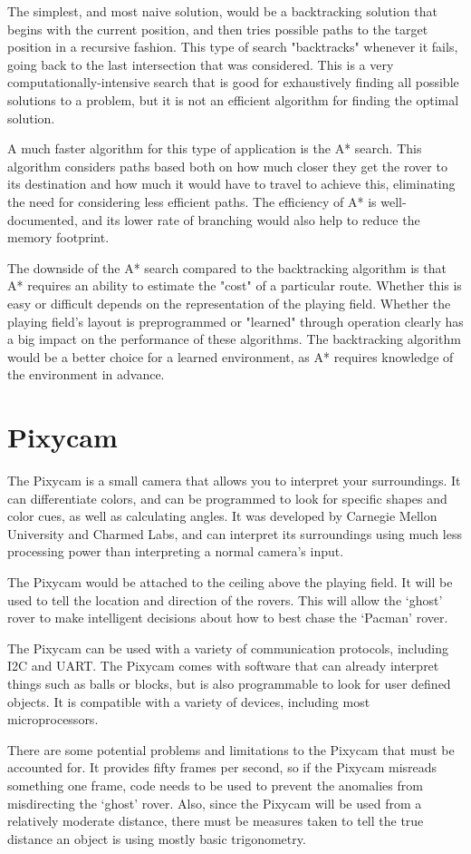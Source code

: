 \documentclass[12pt,letterpaper]{article}
\begin{document}
	The simplest, and most naive solution, would be a backtracking solution that begins with the current position, and then tries possible paths to the target position in a recursive fashion. This type of search "backtracks" whenever it fails, going back to the last intersection that was considered. This is a very computationally-intensive search that is good for exhaustively finding all possible solutions to a problem, but it is not an efficient algorithm for finding the optimal solution.
	
	A much faster algorithm for this type of application is the A* search. This algorithm considers paths based both on how much closer they get the rover to its destination and how much it would have to travel to achieve this, eliminating the need for considering less efficient paths. The efficiency of A* is well-documented, and its lower rate of branching would also help to reduce the memory footprint.
	
	The downside of the A* search compared to the backtracking algorithm is that A* requires an ability to estimate the "cost" of a particular route. Whether this is easy or difficult depends on the representation of the playing field. Whether the playing field's layout is preprogrammed or "learned" through operation clearly has a big impact on the performance of these algorithms. The backtracking algorithm would be a better choice for a learned environment, as A* requires knowledge of the environment in advance.

\section{Pixycam}
The Pixycam is a small camera that allows you to interpret your surroundings. It can differentiate colors, and can be programmed to look for specific shapes and color cues, as well as calculating angles. It was developed by Carnegie Mellon University and Charmed Labs, and can interpret its surroundings using much less processing power than interpreting a normal camera’s input. 

The Pixycam would be attached to the ceiling above the playing field. It will be used to tell the location and direction of the rovers. This will allow the ‘ghost’ rover to make intelligent decisions about how to best chase the ‘Pacman’ rover. 

The Pixycam can be used with a variety of communication protocols, including I2C and UART. The Pixycam comes with software that can already interpret things such as balls or blocks, but is also programmable to look for user defined objects. It is compatible with a variety of devices, including most microprocessors. 

There are some potential problems and limitations to the Pixycam that must be accounted for. It provides fifty frames per second, so if the Pixycam misreads something one frame, code needs to be used to prevent the anomalies from misdirecting the ‘ghost’ rover. Also, since the Pixycam will be used from a relatively moderate distance, there must be measures taken to tell the true distance an object is using mostly basic trigonometry. 
\end{document}
